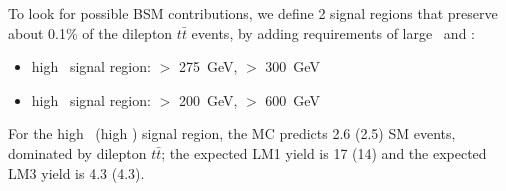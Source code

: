 
%

To look for possible BSM contributions, we define 2 signal regions that preserve about 
0.1\% of the dilepton $t\bar{t}$ events, by adding requirements of large \MET\ and \Ht:

\begin{itemize}
\item high \MET\ signal region: \MET $>$ 275~GeV, \Ht $>$ 300~GeV
\item high \Ht\ signal region:  \MET $>$ 200~GeV, \Ht $>$ 600~GeV
\end{itemize}

For the high \MET\ (high \Ht) signal region, the MC predicts 2.6 (2.5) SM events, 
dominated by dilepton $t\bar{t}$; the expected LM1 yield is 17 (14) and the
expected LM3 yield is 4.3 (4.3). 
